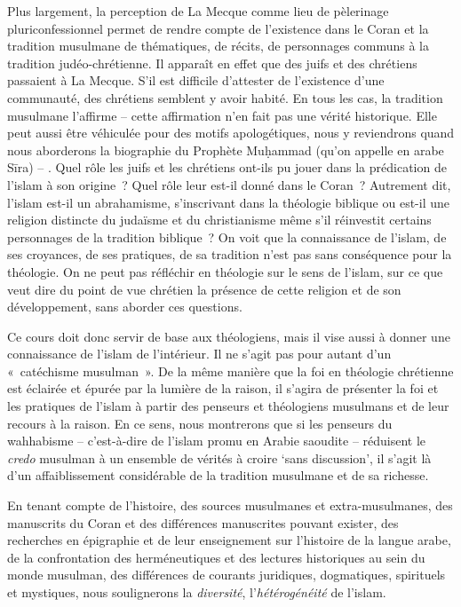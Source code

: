 Plus largement, la perception de La Mecque comme lieu de pèlerinage
pluriconfessionnel permet de rendre compte de l'existence dans le Coran
et la tradition musulmane de thématiques, de récits, de personnages
communs à la tradition judéo-chrétienne. Il apparaît en effet que des
juifs et des chrétiens passaient à La Mecque. S'il est difficile
d'attester de l'existence d'une communauté, des chrétiens semblent y
avoir habité. En tous les cas, la tradition musulmane
l'affirme -- cette affirmation n'en fait pas une
vérité historique. Elle peut aussi être véhiculée pour des motifs
apologétiques, nous y reviendrons quand nous aborderons la biographie du
Prophète Muḥammad (qu'on appelle en arabe Sīra) -- . Quel rôle les juifs
et les chrétiens ont-ils pu jouer dans la prédication de l'islam à son
origine~? Quel rôle leur est-il donné dans le Coran~? Autrement dit,
l'islam est-il un abrahamisme, s'inscrivant dans la théologie biblique
ou est-il une religion distincte du judaïsme et du christianisme même
s'il réinvestit certains personnages de la tradition biblique~? On voit
que la connaissance de l'islam, de ses croyances, de ses pratiques, de
sa tradition n'est pas sans conséquence pour la théologie. On ne peut
pas réfléchir en théologie sur le sens de l'islam, sur ce que veut dire
du point de vue chrétien la présence de cette religion et de son
développement, sans aborder ces questions.

Ce cours doit donc servir de base aux théologiens, mais il vise aussi à
donner une connaissance de l'islam de l'intérieur. Il ne s'agit pas pour
autant d'un «~catéchisme musulman~». De la même manière que la foi en
théologie chrétienne est éclairée et épurée par la lumière de la raison,
il s'agira de présenter la foi et les pratiques de l'islam à partir des
penseurs et théologiens musulmans et de leur recours à la raison. En ce
sens, nous montrerons que si les penseurs du wahhabisme -- c'est-à-dire
de l'islam promu en Arabie saoudite -- réduisent le \emph{credo}
musulman à un ensemble de vérités à croire `sans discussion', il s'agit
là d'un affaiblissement considérable de la tradition musulmane et de sa
richesse.

En tenant compte de l'histoire, des sources musulmanes et
extra-musulmanes, des manuscrits du Coran et des différences manuscrites
pouvant exister, des recherches en épigraphie et de leur enseignement
sur l'histoire de la langue arabe, de la confrontation des
herméneutiques et des lectures historiques au sein du monde musulman,
des différences de courants juridiques, dogmatiques, spirituels et
mystiques, nous soulignerons la \emph{diversité}, l'\emph{hétérogénéité}
de l'islam.

